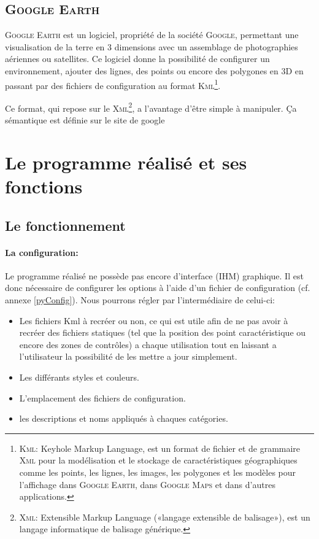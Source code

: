     \subsection{\textsc{Google Earth}}
\textsc{Google Earth} est un logiciel, propriété de la société \textsc{Google}, permettant une visualisation de la terre en 3 dimensions avec un assemblage de photographies aériennes ou satellites. Ce logiciel donne la possibilité de configurer un environnement, ajouter des lignes, des points ou encore des polygones en 3D en passant par des fichiers de configuration au format \textsc{Kml}\footnote{\label{Kml}\textsc{Kml}: Keyhole Markup Language, est un format de fichier et de grammaire \textsc{Xml} pour la modélisation et le stockage de caractéristiques géographiques comme les points, les lignes, les images, les polygones et les modèles pour l'affichage dans \textsc{Google Earth}, dans \textsc{Google Maps} et dans d'autres applications.}.

Ce format, qui repose sur le \textsc{Xml}\footnote{\textsc{Xml}: Extensible Markup Language («langage extensible de balisage»), est un langage informatique de balisage générique.}, a l'avantage d’être simple à manipuler. Ça sémantique est définie sur le site de google  



\section{Le programme réalisé et ses fonctions}
    \subsection{Le fonctionnement\label{fonctionnement}}
            \paragraph{La configuration:}
Le programme réalisé ne possède pas encore d'interface (IHM) graphique. Il est donc nécessaire de configurer les options à l'aide d'un fichier de configuration (cf. annexe \vref{pyConfig}). Nous pourrons régler par l'intermédiaire de celui-ci:
\begin{itemize}
    \item Les fichiers Kml à recréer ou non, ce qui est utile afin de ne pas avoir à recréer des fichiers statiques (tel que la position des point caractéristique ou encore des zones de contrôles) a chaque utilisation tout en laissant a l'utilisateur la possibilité de les mettre a jour simplement.
    \item Les différants styles et couleurs.
    \item L'emplacement des fichiers de configuration.
    \item les descriptions et noms appliqués à chaques catégories.
\end{itemize}\medskip

